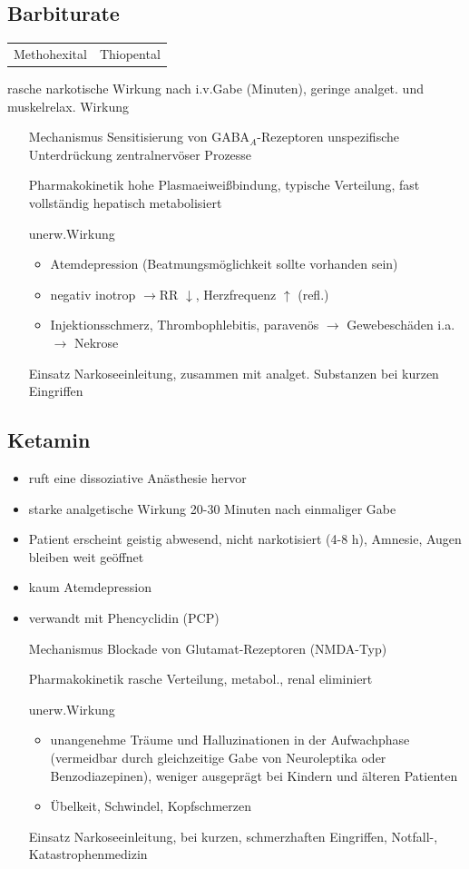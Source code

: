 \documentclass[10pt,a4paper]{report}
\begin{document}
\subsection{Barbiturate} %
\label{sub:barbiturate}
\begin{tabularx}{\textwidth}{XX}
Methohexital&Thiopental\\
\end{tabularx}
rasche narkotische Wirkung nach i.v.Gabe (Minuten), geringe analget. und muskelrelax. Wirkung
\begin{itemize}
	\item[Mechanismus] Sensitisierung von GABA$_A$-Rezeptoren unspezifische Unterdrückung zentralnervöser Prozesse
	\item[Pharmakokinetik] hohe Plasmaeiweißbindung, typische Verteilung, fast vollständig hepatisch metabolisiert
	\item[unerw.Wirkung]
		\begin{itemize}
			\item Atemdepression (Beatmungsmöglichkeit sollte vorhanden sein)
			\item negativ inotrop $\rightarrow$RR $\downarrow$, Herzfrequenz $\uparrow$ (refl.)
			\item Injektionsschmerz, Thrombophlebitis, paravenös $\rightarrow$ Gewebeschäden
i.a.  $\rightarrow$  Nekrose
		\end{itemize}
	\item[Einsatz] Narkoseeinleitung, zusammen mit analget. Substanzen bei kurzen Eingriffen
\end{itemize}
\subsection{Ketamin} %
\label{sub:ketamin}
\begin{itemize}
	\item ruft eine dissoziative Anästhesie hervor
	\item starke analgetische Wirkung 20-30 Minuten nach einmaliger Gabe
	\item Patient erscheint geistig abwesend, nicht narkotisiert (4-8 h), Amnesie, Augen bleiben weit geöffnet
	\item kaum Atemdepression
	\item verwandt mit Phencyclidin (PCP)
	\item[Mechanismus] Blockade von Glutamat-Rezeptoren (NMDA-Typ)
	\item[Pharmakokinetik] rasche Verteilung, metabol., renal eliminiert
	\item[unerw.Wirkung]
	\begin{itemize}
		\item unangenehme Träume und Halluzinationen in der Aufwachphase (vermeidbar   durch gleichzeitige Gabe von Neuroleptika oder Benzodiazepinen), weniger ausgeprägt bei Kindern und älteren Patienten
		\item Übelkeit, Schwindel, Kopfschmerzen
	\end{itemize}
	\item[Einsatz]  Narkoseeinleitung, bei kurzen, schmerzhaften Eingriffen, Notfall-, Katastrophenmedizin
\end{itemize}
\end{document}
